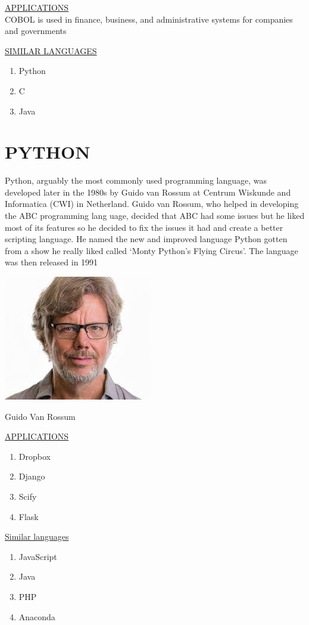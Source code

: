 \documentclass{article}
\begin{document}
\newpage
\underline{APPLICATIONS}\\
          COBOL is used in finance, business, and
          administrative systems for companies and governments

\underline{SIMILAR LANGUAGES}\\
\begin{enumerate}
	\item Python
	\item C
	\item Java
\end{enumerate}

\newpage
\section{\textbf{PYTHON}}
Python, arguably the most commonly used programming language, was developed later in the 1980s by Guido van Rossum at Centrum Wiskunde and Informatica (CWI) in Netherland. 
Guido van Rossum, who helped in developing the ABC programming lang  uage, decided that ABC had some issues but he liked most of its features so he decided to fix the issues it had and create a better scripting language. He named the new and improved language Python gotten from a show he really liked called ‘Monty Python’s Flying Circus’.
The language was then released in 1991


\newpage
\includegraphics{guido.jpg}
\caption{Guido Van Rossum}
\newpage

\underline{APPLICATIONS}

\begin{enumerate}
\item Dropbox
\item Django
\item Scify
\item Flask
\end{enumerate}


\underline{Similar languages}

\begin{enumerate}
	\item JavaScript
	\item Java
	\item PHP
	\item Anaconda
	
\end{enumerate}
\end{document}
